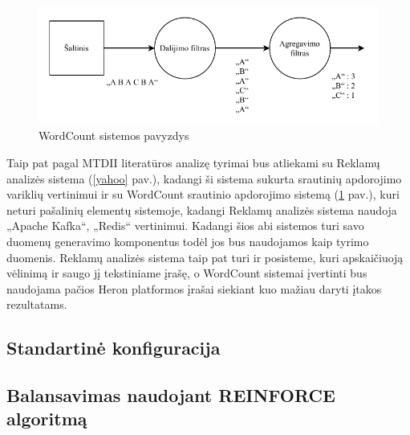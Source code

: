 \documentclass{VUMIFPSbakalaurinis}
\begin{document}
\begin{figure}[H]
    \includegraphics[width=15cm]{img/wordcount.pdf}
    \caption{WordCount sistemos pavyzdys}
    \label{wordcount}
\end{figure} 

Taip pat pagal MTDII literatūros analizę tyrimai bus atliekami su Reklamų analizės sistema (\ref{yahoo} pav.), kadangi ši sistema sukurta srautinių apdorojimo variklių vertinimui ir su WordCount srautinio apdorojimo sistemą (\ref{wordcount} pav.), kuri neturi pašalinių elementų sistemoje, kadangi Reklamų analizės sistema naudoja „Apache Kafka“, „Redis“ vertinimui.
Kadangi šios abi sistemos turi savo duomenų generavimo komponentus todėl jos bus naudojamos kaip tyrimo duomenis. Reklamų analizės sistema taip pat turi ir posisteme, kuri apskaičiuoją vėlinimą ir saugo jį tekstiniame įrašę, o WordCount sistemai įvertinti bus naudojama pačios Heron platformos įrašai siekiant kuo mažiau daryti įtakos rezultatams.

\subsection{Standartinė konfiguracija}

\subsection{Balansavimas naudojant REINFORCE algoritmą}


\printbibliography[heading=bibintoc] 
\end{document}
